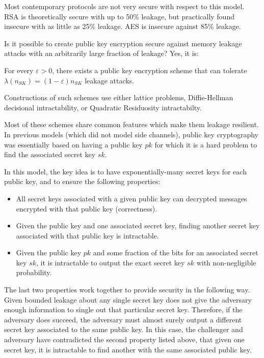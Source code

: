 \documentclass[10pt]{article}
\begin{document}
Most contemporary protocols are not very secure with respect to this model. RSA is theoretically secure with up to 50\% leakage, but practically found insecure with as little as 25\% leakage. AES is insecure against 85\% leakage.

Is it possible to create public key encryption secure against memory leakage attacks with an arbitrarily large fraction of leakage? Yes, it is:

\begin{theorem}
For every $\varepsilon > 0$, there exists a public key encryption scheme that can tolerate $\lambda(n_{SK}) = (1 - \varepsilon)n_{SK}$ leakage attacks.
\end{theorem}
Constructions of such schemes use either lattice problems, Diffie-Hellman decisional intractability, or Quadratic Residuosity intractabilty.

Most of these schemes share common features which make them leakage resilient. In previous models (which did not model side channels), public key cryptography was essentially based on having a public key $pk$ for which it is a hard problem to find the associated secret key $sk$.

In this model, the key idea is to have exponentially-many secret keys for each public key, and to ensure the following properties:
\begin{itemize}
\item All secret keys associated with a given public key can decrypted messages encrypted with that public key (correctness).
\item Given the public key and one associated secret key, finding another secret key associated with that public key is intractable.
\item Given the public key $pk$ and some fraction of the bits for an associated secret key $sk$, it is intractable to output the exact secret key $sk$ with non-negligible probability.
\end{itemize}

The last two properties work together to provide security in the following way. Given bounded leakage about any single secret key does not give the adversary enough information to single out that particular secret key. Therefore, if the adversary does succeed, the adversary must almost surely output a different secret key associated to the same public key. In this case, the challenger and adversary have contradicted the second property listed above, that given one secret key, it is intractable to find another with the same associated public key.
\end{document}
